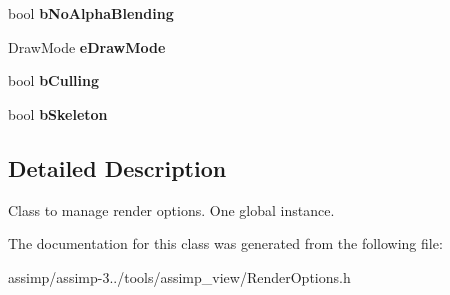\begin{DoxyCompactItemize}
\item 
\hypertarget{class_render_options_a2d3e61fe725203b2c0619015ca8c352e}{bool {\bfseries b\+No\+Alpha\+Blending}}\label{class_render_options_a2d3e61fe725203b2c0619015ca8c352e}

\item 
\hypertarget{class_render_options_a2cf9988584ea22a2699f79ef029a8e4a}{Draw\+Mode {\bfseries e\+Draw\+Mode}}\label{class_render_options_a2cf9988584ea22a2699f79ef029a8e4a}

\item 
\hypertarget{class_render_options_a11ec791e36d25f0c958b3553b79bd874}{bool {\bfseries b\+Culling}}\label{class_render_options_a11ec791e36d25f0c958b3553b79bd874}

\item 
\hypertarget{class_render_options_a5c8aeae251ef209bec74b704f48c341c}{bool {\bfseries b\+Skeleton}}\label{class_render_options_a5c8aeae251ef209bec74b704f48c341c}

\end{DoxyCompactItemize}


\subsection{Detailed Description}
Class to manage render options. One global instance. 

The documentation for this class was generated from the following file\+:\begin{DoxyCompactItemize}
\item 
assimp/assimp-\/3../tools/assimp\+\_\+view/Render\+Options.\+h\end{DoxyCompactItemize}
